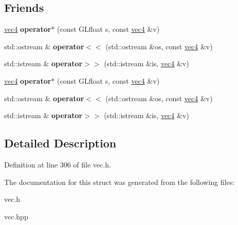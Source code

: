 \subsection*{\-Friends}
\begin{DoxyCompactItemize}
\item 
\hypertarget{struct_angel_1_1vec4_a18b1a91dc4c502220d099d6d85e504bc}{\hyperlink{struct_angel_1_1vec4}{vec4} {\bfseries operator$\ast$} (const \-G\-Lfloat s, const \hyperlink{struct_angel_1_1vec4}{vec4} \&v)}\label{struct_angel_1_1vec4_a18b1a91dc4c502220d099d6d85e504bc}

\item 
\hypertarget{struct_angel_1_1vec4_afadcf8884205c469256e4be7d96bfa12}{std\-::ostream \& {\bfseries operator$<$$<$} (std\-::ostream \&os, const \hyperlink{struct_angel_1_1vec4}{vec4} \&v)}\label{struct_angel_1_1vec4_afadcf8884205c469256e4be7d96bfa12}

\item 
\hypertarget{struct_angel_1_1vec4_ada396ae1c4ef513c6baf301f20f89bfa}{std\-::istream \& {\bfseries operator$>$$>$} (std\-::istream \&is, \hyperlink{struct_angel_1_1vec4}{vec4} \&v)}\label{struct_angel_1_1vec4_ada396ae1c4ef513c6baf301f20f89bfa}

\item 
\hypertarget{struct_angel_1_1vec4_a18b1a91dc4c502220d099d6d85e504bc}{\hyperlink{struct_angel_1_1vec4}{vec4} {\bfseries operator$\ast$} (const \-G\-Lfloat s, const \hyperlink{struct_angel_1_1vec4}{vec4} \&v)}\label{struct_angel_1_1vec4_a18b1a91dc4c502220d099d6d85e504bc}

\item 
\hypertarget{struct_angel_1_1vec4_afadcf8884205c469256e4be7d96bfa12}{std\-::ostream \& {\bfseries operator$<$$<$} (std\-::ostream \&os, const \hyperlink{struct_angel_1_1vec4}{vec4} \&v)}\label{struct_angel_1_1vec4_afadcf8884205c469256e4be7d96bfa12}

\item 
\hypertarget{struct_angel_1_1vec4_ada396ae1c4ef513c6baf301f20f89bfa}{std\-::istream \& {\bfseries operator$>$$>$} (std\-::istream \&is, \hyperlink{struct_angel_1_1vec4}{vec4} \&v)}\label{struct_angel_1_1vec4_ada396ae1c4ef513c6baf301f20f89bfa}

\end{DoxyCompactItemize}


\subsection{\-Detailed \-Description}


\-Definition at line 306 of file vec.\-h.



\-The documentation for this struct was generated from the following files\-:\begin{DoxyCompactItemize}
\item 
vec.\-h\item 
vec.\-hpp\end{DoxyCompactItemize}
